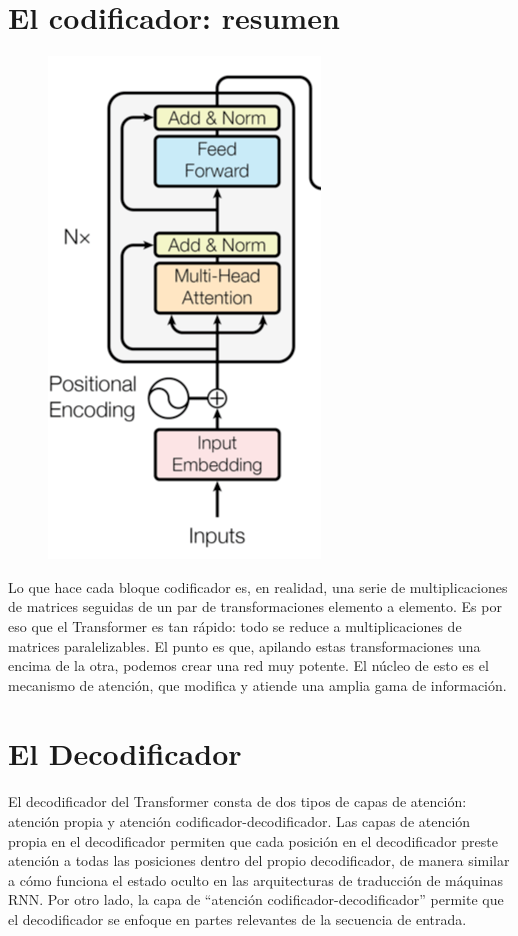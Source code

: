 \section{El codificador: resumen}

\begin{figure}[h]
  \centering
  \includegraphics[scale=0.39]{pics/transformerencoder.png}
\end{figure}

Lo que hace cada bloque codificador es, en realidad, una serie de multiplicaciones de matrices seguidas de un par de transformaciones elemento a elemento. Es por eso que el Transformer es tan rápido: todo se reduce a multiplicaciones de matrices paralelizables. El punto es que, apilando estas transformaciones una encima de la otra, podemos crear una red muy potente. El núcleo de esto es el mecanismo de atención, que modifica y atiende una amplia gama de información.



\section{El Decodificador}

El decodificador del Transformer consta de dos tipos de capas de atención: atención propia y atención codificador-decodificador. Las capas de atención propia en el decodificador permiten que cada posición en el decodificador preste atención a todas las posiciones dentro del propio decodificador, de manera similar a cómo funciona el estado oculto en las arquitecturas de traducción de máquinas RNN.  Por otro lado, la capa de ``atención codificador-decodificador'' permite que el decodificador se enfoque en partes relevantes de la secuencia de entrada.

